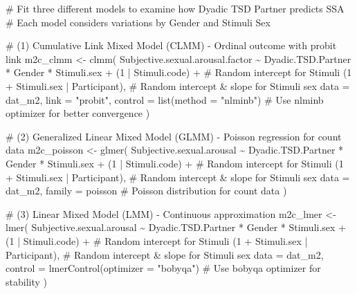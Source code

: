 \documentclass[
  bookmarksnumbered]{article}
\newenvironment{Shaded}{\begin{snugshade}}{\end{snugshade}}
\newcommand{\AttributeTok}[1]{\textcolor[rgb]{0.80,0.80,0.80}{#1}}
\newcommand{\CommentTok}[1]{\textcolor[rgb]{0.50,0.62,0.50}{#1}}
\newcommand{\DecValTok}[1]{\textcolor[rgb]{0.86,0.86,0.80}{#1}}
\newcommand{\FunctionTok}[1]{\textcolor[rgb]{0.94,0.94,0.56}{#1}}
\newcommand{\NormalTok}[1]{\textcolor[rgb]{0.80,0.80,0.80}{#1}}
\newcommand{\OtherTok}[1]{\textcolor[rgb]{0.94,0.94,0.56}{#1}}
\newcommand{\SpecialCharTok}[1]{\textcolor[rgb]{0.86,0.64,0.64}{#1}}
\newcommand{\StringTok}[1]{\textcolor[rgb]{0.80,0.58,0.58}{#1}}
\begin{document}
\begin{Shaded}
\begin{Highlighting}[]
\CommentTok{\# Fit three different models to examine how Dyadic TSD Partner predicts SSA}
\CommentTok{\# Each model considers variations by Gender and Stimuli Sex}

\CommentTok{\# (1) Cumulative Link Mixed Model (CLMM) {-} Ordinal outcome with probit link}
\NormalTok{m2c\_clmm }\OtherTok{\textless{}{-}} \FunctionTok{clmm}\NormalTok{(}
\NormalTok{  Subjective.sexual.arousal.factor }\SpecialCharTok{\textasciitilde{}}\NormalTok{ Dyadic.TSD.Partner }\SpecialCharTok{*}\NormalTok{ Gender }\SpecialCharTok{*}\NormalTok{ Stimuli.sex }\SpecialCharTok{+}
\NormalTok{    (}\DecValTok{1} \SpecialCharTok{|}\NormalTok{ Stimuli.code) }\SpecialCharTok{+} \CommentTok{\# Random intercept for Stimuli}
\NormalTok{    (}\DecValTok{1} \SpecialCharTok{+}\NormalTok{ Stimuli.sex }\SpecialCharTok{|}\NormalTok{ Participant), }\CommentTok{\# Random intercept \& slope for Stimuli sex}
  \AttributeTok{data =}\NormalTok{ dat\_m2,}
  \AttributeTok{link =} \StringTok{"probit"}\NormalTok{,}
  \AttributeTok{control =} \FunctionTok{list}\NormalTok{(}\AttributeTok{method =} \StringTok{"nlminb"}\NormalTok{) }\CommentTok{\# Use \textquotesingle{}nlminb\textquotesingle{} optimizer for better convergence}
\NormalTok{)}

\CommentTok{\# (2) Generalized Linear Mixed Model (GLMM) {-} Poisson regression for count data}
\NormalTok{m2c\_poisson }\OtherTok{\textless{}{-}} \FunctionTok{glmer}\NormalTok{(}
\NormalTok{  Subjective.sexual.arousal }\SpecialCharTok{\textasciitilde{}}\NormalTok{ Dyadic.TSD.Partner }\SpecialCharTok{*}\NormalTok{ Gender }\SpecialCharTok{*}\NormalTok{ Stimuli.sex }\SpecialCharTok{+}
\NormalTok{    (}\DecValTok{1} \SpecialCharTok{|}\NormalTok{ Stimuli.code) }\SpecialCharTok{+} \CommentTok{\# Random intercept for Stimuli}
\NormalTok{    (}\DecValTok{1} \SpecialCharTok{+}\NormalTok{ Stimuli.sex }\SpecialCharTok{|}\NormalTok{ Participant), }\CommentTok{\# Random intercept \& slope for Stimuli sex}
  \AttributeTok{data =}\NormalTok{ dat\_m2,}
  \AttributeTok{family =}\NormalTok{ poisson }\CommentTok{\# Poisson distribution for count data}
\NormalTok{)}

\CommentTok{\# (3) Linear Mixed Model (LMM) {-} Continuous approximation}
\NormalTok{m2c\_lmer }\OtherTok{\textless{}{-}} \FunctionTok{lmer}\NormalTok{(}
\NormalTok{  Subjective.sexual.arousal }\SpecialCharTok{\textasciitilde{}}\NormalTok{ Dyadic.TSD.Partner }\SpecialCharTok{*}\NormalTok{ Gender }\SpecialCharTok{*}\NormalTok{ Stimuli.sex }\SpecialCharTok{+}
\NormalTok{    (}\DecValTok{1} \SpecialCharTok{|}\NormalTok{ Stimuli.code) }\SpecialCharTok{+} \CommentTok{\# Random intercept for Stimuli}
\NormalTok{    (}\DecValTok{1} \SpecialCharTok{+}\NormalTok{ Stimuli.sex }\SpecialCharTok{|}\NormalTok{ Participant), }\CommentTok{\# Random intercept \& slope for Stimuli sex}
  \AttributeTok{data =}\NormalTok{ dat\_m2,}
  \AttributeTok{control =} \FunctionTok{lmerControl}\NormalTok{(}\AttributeTok{optimizer =} \StringTok{"bobyqa"}\NormalTok{) }\CommentTok{\# Use \textquotesingle{}bobyqa\textquotesingle{} optimizer for stability}
\NormalTok{)}
\end{Highlighting}
\end{Shaded}
\end{document}
